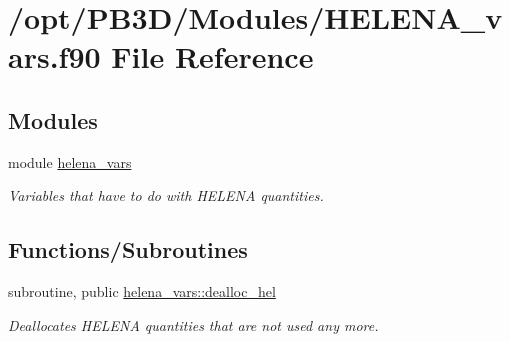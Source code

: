 \hypertarget{HELENA__vars_8f90}{}\section{/opt/\+P\+B3\+D/\+Modules/\+H\+E\+L\+E\+N\+A\+\_\+vars.f90 File Reference}
\label{HELENA__vars_8f90}
\subsection*{Modules}
\begin{DoxyCompactItemize}
\item 
module \hyperlink{namespacehelena__vars}{helena\+\_\+vars}
\begin{DoxyCompactList}\small\item\em Variables that have to do with H\+E\+L\+E\+NA quantities. \end{DoxyCompactList}\end{DoxyCompactItemize}
\subsection*{Functions/\+Subroutines}
\begin{DoxyCompactItemize}
\item 
subroutine, public \hyperlink{namespacehelena__vars_add7b3eea7306eca7fb45737ff915523f}{helena\+\_\+vars\+::dealloc\+\_\+hel}
\begin{DoxyCompactList}\small\item\em Deallocates H\+E\+L\+E\+NA quantities that are not used any more. \end{DoxyCompactList}\end{DoxyCompactItemize}
